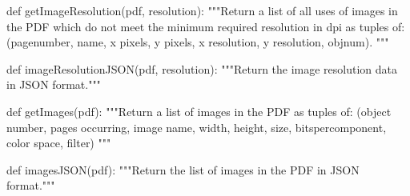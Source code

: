def getImageResolution(pdf, resolution):
    """Return a list of all uses of images in the PDF which do not meet the
    minimum required resolution in dpi as tuples of:
    (pagenumber, name, x pixels, y pixels, x resolution, y resolution, objnum).
    """

def imageResolutionJSON(pdf, resolution):
    """Return the image resolution data in JSON format."""

def getImages(pdf):
    """Return a list of images in the PDF as tuples of:
    (object number, pages occurring, image name, width, height, size,
     bitspercomponent, color space, filter)
    """

def imagesJSON(pdf):
    """Return the list of images in the PDF in JSON format."""
